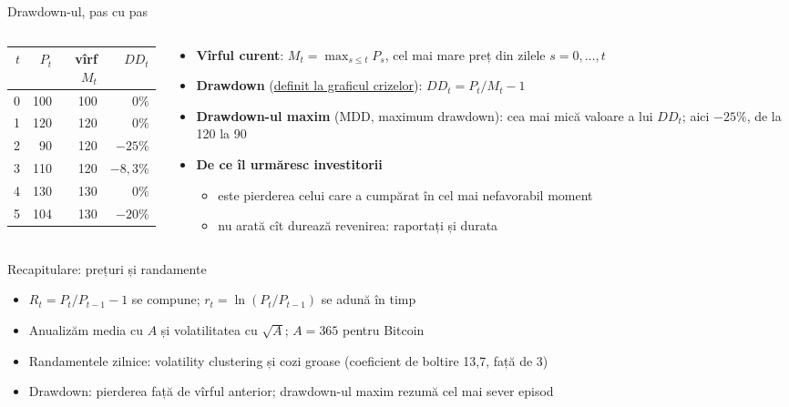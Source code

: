 \begin{frame}{Drawdown-ul, pas cu pas}
\itemsize{\footnotesize}
\begin{columns}[T]
\begin{column}{0.38\textwidth}
\begin{center}
\footnotesize
\begin{tabular}{rrrr}
\toprule
$t$ & $P_t$ & vîrf $M_t$ & $DD_t$ \\
\midrule
0 & 100 & 100 & $0\%$ \\
1 & 120 & 120 & $0\%$ \\
2 & 90 & 120 & $-25\%$ \\
3 & 110 & 120 & $-8{,}3\%$ \\
4 & 130 & 130 & $0\%$ \\
5 & 104 & 130 & $-20\%$ \\
\bottomrule
\end{tabular}
\end{center}

\end{column}
\begin{column}{0.58\textwidth}
\begin{itemize}
    \item \textbf{Vîrful curent}: $M_t = \max_{s \le t} P_s$, cel mai mare preț din zilele $s = 0, \ldots, t$
    \item \textbf{Drawdown} (\hyperlink{ch0-dd}{\textcolor{MainBlue}{definit la graficul crizelor}}): $DD_t = P_t / M_t - 1$
    \item \textbf{Drawdown-ul maxim} (MDD, maximum drawdown): cea mai mică valoare a lui $DD_t$; aici $-25\%$, de la 120 la 90
    \item \textbf{De ce îl urmăresc investitorii}
    \begin{itemize}
        \item este pierderea celui care a cumpărat în cel mai nefavorabil moment
        \item nu arată cît durează revenirea: raportați și durata
    \end{itemize}
\end{itemize}
\end{column}
\end{columns}
\end{frame}

\begin{frame}{Recapitulare: prețuri și randamente}
\itemsize{\small}
\begin{itemize}
    \item $R_t = P_t/P_{t-1} - 1$ se compune; $r_t = \ln(P_t/P_{t-1})$ se adună în timp
    \item Anualizăm media cu $A$ și volatilitatea cu $\sqrt{A}$; $A = 365$ pentru Bitcoin
    \item Randamentele zilnice: volatility clustering și cozi groase (coeficient de boltire 13{,}7, față de 3)
    \item Drawdown: pierderea față de vîrful anterior; drawdown-ul maxim rezumă cel mai sever episod
\end{itemize}
\end{frame}


